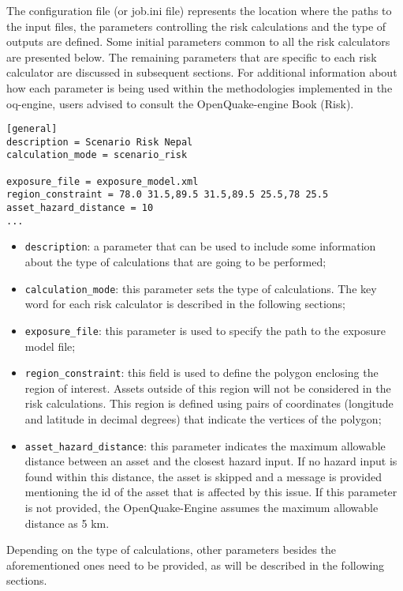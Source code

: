 The configuration file (or job.ini file) represents the location where the
paths to the input files, the parameters controlling the risk calculations and
the type of outputs are defined. Some initial parameters common to all the
risk calculators are presented below. The remaining parameters that are
specific to each risk calculator are discussed in subsequent sections. For
additional information about how each parameter is being used within the
methodologies implemented in the oq-engine, users advised to consult the
OpenQuake-engine Book (Risk).

\begin{Verbatim}[frame=single, commandchars=\\\{\}, samepage=true]
[general]
description = Scenario Risk Nepal
calculation_mode = scenario_risk

exposure_file = exposure_model.xml
region_constraint = 78.0 31.5,89.5 31.5,89.5 25.5,78 25.5
asset_hazard_distance = 10
...
\end{Verbatim}

\begin{itemize}
\item  \Verb+description+: a parameter that can be used to include some information about the type of calculations that are going to be performed;
\item  \Verb+calculation_mode+: this parameter sets the type of calculations. The key word for each risk calculator is described in the following sections;
\item  \Verb+exposure_file+: this parameter is used to specify the path to the \gls{exposure model} file;
\item  \Verb+region_constraint+: this field is used to define the polygon enclosing the region of interest. Assets outside of this region will not be considered in the risk calculations. This region is defined using pairs of coordinates (longitude and latitude in decimal degrees) that indicate the vertices of the polygon;
\item  \Verb+asset_hazard_distance+: this parameter indicates the maximum allowable distance between an \gls{asset} and the closest hazard input. If no hazard input is found within this distance, the \gls{asset} is skipped and a message is provided mentioning the id of the asset that is affected by this issue. If this parameter is not provided, the OpenQuake-Engine assumes the maximum allowable distance as 5 km.
\end{itemize}

Depending on the type of calculations, other parameters besides the
aforementioned ones need to be provided, as will be described in the following
sections.

